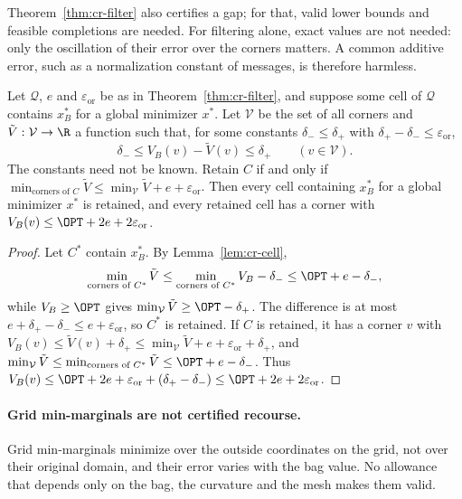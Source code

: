 Theorem~\ref{thm:cr-filter} also certifies a gap; for that, valid lower
bounds and feasible completions are needed. For filtering alone, exact
values are not needed: only the oscillation of their error over the corners
matters. A common additive error, such as a normalization constant of
messages, is therefore harmless.

\begin{proposition}\label{prop:cr-osc}
Let $\mathcal Q$, $e$ and $\varepsilon_{\mathrm{or}}$ be as in Theorem~\ref{thm:cr-filter}, and
suppose some cell of $\mathcal Q$ contains $x^*_B$ for a global minimizer
$x^*$. Let $\mathcal V$ be the set of all corners and
$\tilde V:\mathcal V\to\R$ a function such that, for some constants
$\delta_-\le\delta_+$ with $\delta_+-\delta_-\le\varepsilon_{\mathrm{or}}$,
\[
\delta_-\le V_B(v)-\tilde V(v)\le\delta_+\qquad(v\in\mathcal V).
\]
The constants need not be known. Retain $C$ if and only if
$\min_{\text{corners of }C}\tilde V\le\min_{\mathcal V}\tilde V+e+\varepsilon_{\mathrm{or}}$.
Then every cell containing $x^*_B$ for a global minimizer $x^*$ is
retained, and every retained cell has a corner with
$V_B(v)\le\OPT+2e+2\varepsilon_{\mathrm{or}}$.
\end{proposition}

\begin{proof}
Let $C^*$ contain $x^*_B$. By Lemma~\ref{lem:cr-cell},
\[
\min_{\text{corners of }C^*}\tilde V\le\min_{\text{corners of }C^*}V_B-\delta_-
\le\OPT+e-\delta_-,
\]
while $V_B\ge\OPT$ gives $\min_{\mathcal V}\tilde V\ge\OPT-\delta_+$. The
difference is at most $e+\delta_+-\delta_-\le e+\varepsilon_{\mathrm{or}}$, so $C^*$ is retained.
If $C$ is retained, it has a corner $v$ with
$V_B(v)\le\tilde V(v)+\delta_+\le\min_{\mathcal V}\tilde V+e+\varepsilon_{\mathrm{or}}+\delta_+$, and
$\min_{\mathcal V}\tilde V\le\min_{\text{corners of }C^*}\tilde V\le\OPT+e-\delta_-$.
Thus $V_B(v)\le\OPT+2e+\varepsilon_{\mathrm{or}}+(\delta_+-\delta_-)\le\OPT+2e+2\varepsilon_{\mathrm{or}}$.
\end{proof}

\paragraph{Grid min-marginals are not certified recourse.}
Grid min-marginals minimize over the outside coordinates on the grid, not
over their original domain, and their error varies with the bag value. No
allowance that depends only on the bag, the curvature and the mesh makes
them valid.

